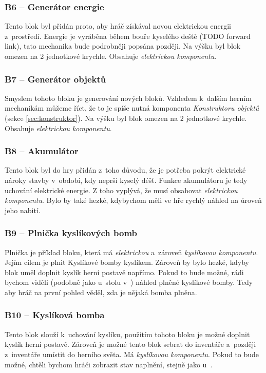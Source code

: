 \subsubsection{B6 -- Generátor energie}
\label{blocks:B6}
Tento blok byl přidán proto, aby hráč získával novou elektrickou energii z~prostředí. Energie je vyráběna během bouře kyselého deště (TODO forward link), tato mechanika bude podrobněji popsána později. Na výšku byl blok omezen na 2 jednotkové krychle. Obsahuje \textit{elektrickou komponentu}. 


\subsubsection{B7 -- Generátor objektů}
\label{blocks:B7}
Smyslem tohoto bloku je generování nových bloků. Vzhledem k~dalším herním mechanikám můžeme říct, že to je spíše nutná komponenta \textit{Konstruktoru objektů} (sekce \ref{sec:konstruktor}). Na výšku byl blok omezen na 2 jednotkové krychle. Obsahuje \textit{elektrickou komponentu}.


\subsubsection{B8 -- Akumulátor}
\label{blocks:B8}
Tento blok byl do hry přidán z~toho důvodu, že je potřeba pokrýt elektrické nároky stavby v~období, kdy neprší kyselý déšť. Funkce akumulátoru je tedy uchování elektrické energie. Z toho vyplývá, že musí obsahovat \textit{elektrickou komponentu}. Bylo by také hezké, kdybychom měli ve hře rychlý náhled na úroveň jeho nabití.


\subsubsection{B9 -- Plnička kyslíkových bomb}
\label{blocks:B9}
Plnička je příklad bloku, která má \textit{elektrickou} a~zároveň \textit{kyslíkovou komponentu}. Jejím cílem je plnit Kyslíkové bomby kyslíkem. Zároveň by bylo hezké, kdyby blok uměl doplnit kyslík herní postavě napřímo. Pokud to bude možné, rádi bychom viděli (podobně jako u~stolu v~\ME{}) náhled plněné kyslíkové bomby. Tedy aby hráč na první pohled věděl, zda je nějaká bomba plněna.

\subsubsection{B10 -- Kyslíková bomba}
\label{blocks:B10}
Tento blok slouží k~uchování kyslíku, použitím tohoto bloku je možné doplnit kyslík herní postavě. Zároveň je možné tento blok sebrat do inventáře a~později z~inventáře umístit do herního světa. Má \textit{kyslíkovou komponentu}. Pokud to bude možné, chtěli bychom hráči zobrazit stav naplnění, stejně jako u~.


